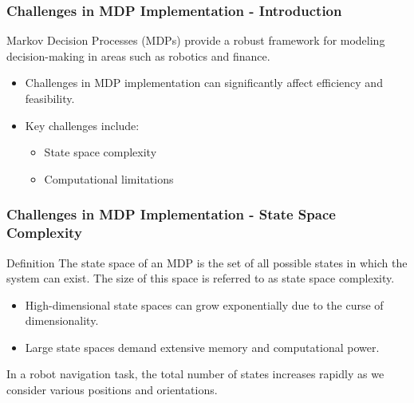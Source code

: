 \documentclass{beamer}
\begin{document}
\begin{frame}[fragile]
    \frametitle{Challenges in MDP Implementation - Introduction}
    Markov Decision Processes (MDPs) provide a robust framework for modeling decision-making in areas such as robotics and finance. 
    \begin{itemize}
        \item Challenges in MDP implementation can significantly affect efficiency and feasibility.
        \item Key challenges include:
            \begin{itemize}
                \item State space complexity
                \item Computational limitations
            \end{itemize}
    \end{itemize}
\end{frame}

\begin{frame}[fragile]
    \frametitle{Challenges in MDP Implementation - State Space Complexity}
    \begin{block}{Definition}
        The state space of an MDP is the set of all possible states in which the system can exist. The size of this space is referred to as state space complexity.
    \end{block}
    
    \begin{itemize}
        \item High-dimensional state spaces can grow exponentially due to the curse of dimensionality.
        \item Large state spaces demand extensive memory and computational power.
    \end{itemize}
    
    \begin{example}
        In a robot navigation task, the total number of states increases rapidly as we consider various positions and orientations.
    \end{example}
\end{frame}
\end{document}
